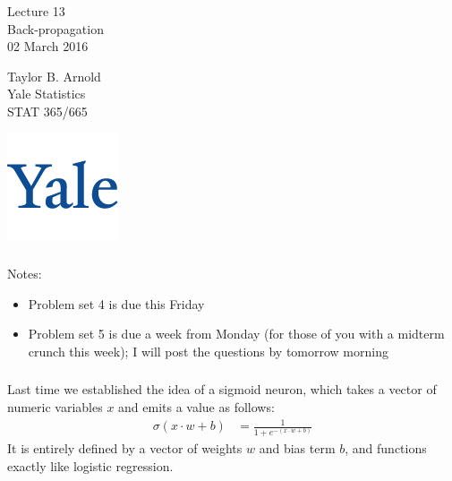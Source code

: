 \documentclass[xetex,mathserif,serif,aspectratio=169]{beamer}
\begin{document}
\begin{frame}[fragile] \frametitle{} \oldB \small

\vfill

{\fontsize{0.7cm}{0cm}\selectfont Lecture 13 \\\vspace{0.2cm} Back-propagation}\\\vspace{0.5cm}
02 March 2016

\vspace{2cm}

\begin{minipage}{0.6\textwidth}
Taylor B. Arnold \\
Yale Statistics \\
STAT 365/665
\end{minipage}
\hfill
\begin{minipage}{0.3\textwidth}\raggedleft
\includegraphics[scale=0.3]{../yale-logo.png}
\end{minipage}%

\end{frame}

\begin{frame}[fragile] \frametitle{} \oldB \small

Notes:
\begin{itemize}
\item Problem set 4 is due this Friday
\item Problem set 5 is due a week from Monday (for those of you
with a midterm crunch this week); I will post the questions by
tomorrow morning
\end{itemize}

\end{frame}

\begin{frame}[fragile] \frametitle{} \oldB \small


Last time we established the idea of a sigmoid neuron,
which takes a vector of numeric variables $x$ and emits
a value as follows:
\begin{align*}
\sigma(x \cdot w + b) &= \frac{1}{1 + e^{-(x \cdot w + b)}}
\end{align*}
It is entirely defined by a vector of weights $w$ and bias term $b$,
and functions exactly like logistic regression.

\end{frame}
\end{document}
